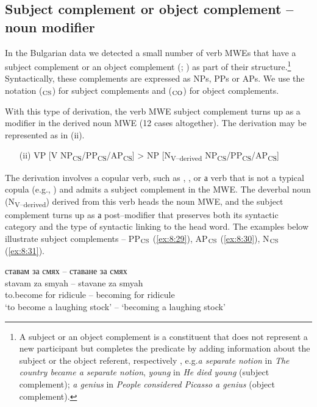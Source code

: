 \documentclass[output=paper]{langsci/langscibook}
\begin{document}
\subsection{Subject complement or object complement -- noun modifier}
\label{section62}


In the Bulgarian data we detected a small number of verb MWEs that have
a subject complement or an object complement (\citealt{quirk1985}; \citealt{downing2014}) as part of their structure.\footnote{A subject or an 
object complement is a constituent that does not represent a new
participant but completes the predicate by adding information about the
subject or the object referent, respectively \citep{downing2014}, e.g.\@ \textit{a
separate notion} in \textit{The country became a separate notion}, \textit{young} in
\textit{He died young} (subject complement); \textit{a genius} in \textit{People considered
Picasso a genius} (object complement).} Syntactically, these
complements are expressed as NPs, PPs or APs. We use the notation
  ($_{\textup{CS}}$) for subject complements and  ($_{\textup{CO}}$)
for object complements. 

With this type of derivation, the verb MWE subject
complement turns up as a modifier in the derived noun MWE (12 cases
altogether). The derivation may be represented as in (ii).


\renewcommand{\theenumi}{(\roman{enumi})}%
\begin{enumerate}
 \setcounter{enumi}{1}
\item[(ii)]  VP [V
NP\textsubscript{CS}/PP\textsubscript{CS}/AP\textsubscript{CS}] > NP
[N\textsubscript{V–derived}
NP\textsubscript{CS}/PP\textsubscript{CS}/AP\textsubscript{CS}]
\end{enumerate}

The derivation involves a copular verb, such as 
, 
, 
 or а verb that is not a typical
copula (e.g., 
) and admits a subject complement in the
MWE. The deverbal noun (N\textsubscript{V–derived}) derived from this
verb heads the noun MWE, and the subject complement turns up as а
post–modifier that preserves both its syntactic category and the type
of syntactic linking to the head word. The examples below illustrate
subject complements – PP$_{\textup{CS}}$  (\ref{ex:8:29}), AP$_{\textup{CS}}$ (\ref{ex:8:30}), N$_{\textup{CS}}$  (\ref{ex:8:31}).


\begin{exe}
\ex \label{ex:8:29}
\settowidth{}
\glll ставам за смях -- ставане за смях\\
stavam za smyah -- stavane za smyah \\
{to.become} for ridicule -- becoming for ridicule\\ 
\glt ‘to become a laughing stock’ -- ‘becoming a laughing stock’
\end{exe}
\end{document}
